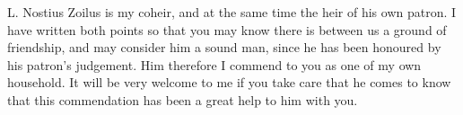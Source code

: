 

L. Nostius Zoilus is my coheir, and at the same time the heir of his own patron. I have written both points so that you may know there is between us a ground of friendship, and may consider him a sound man, since he has been honoured by his patron's judgement. Him therefore I commend to you as one of my own household. It will be very welcome to me if you take care that he comes to know that this commendation has been a great help to him with you.
